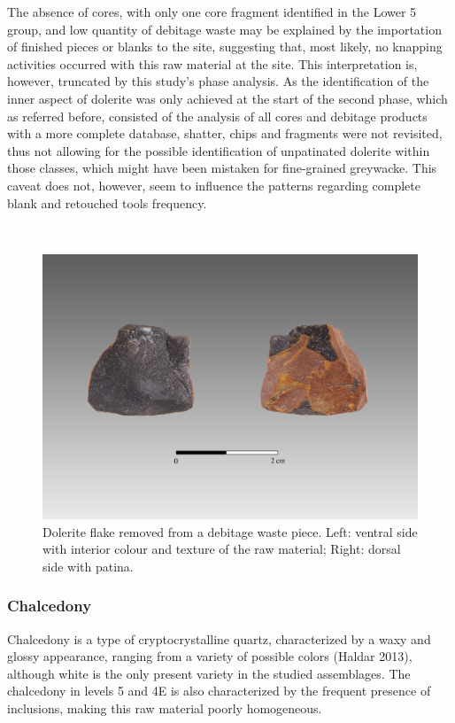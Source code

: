 \documentclass[12pt,twoside]{reedthesis}
\begin{document}
The absence of cores, with only one core fragment identified in the Lower 5 group, and low quantity of debitage waste may be explained by the importation of finished pieces or blanks to the site, suggesting that, most likely, no knapping activities occurred with this raw material at the site. This interpretation is, however, truncated by this study's phase analysis. As the identification of the inner aspect of dolerite was only achieved at the start of the second phase, which as referred before, consisted of the analysis of all cores and debitage products with a more complete database, shatter, chips and fragments were not revisited, thus not allowing for the possible identification of unpatinated dolerite within those classes, which might have been mistaken for fine-grained greywacke. This caveat does not, however, seem to influence the patterns regarding complete blank and retouched tools frequency.

~
\begin{figure}

{\centering \includegraphics[width=0.7\linewidth]{figure/doleritephoto} 

}

\caption[Dolerite flake removed from a debitage waste piece.]{Dolerite flake removed from a debitage waste piece. Left: ventral side with interior colour and texture of the raw material; Right: dorsal side with patina.}\label{fig:doleritephoto}
\end{figure}
\newpage

\hypertarget{chalcedony}{%
\subsubsection{Chalcedony}\label{chalcedony}}

Chalcedony is a type of cryptocrystalline quartz, characterized by a waxy and glossy appearance, ranging from a variety of possible colors (Haldar 2013), although white is the only present variety in the studied assemblages. The chalcedony in levels 5 and 4E is also characterized by the frequent presence of inclusions, making this raw material poorly homogeneous.
\end{document}
